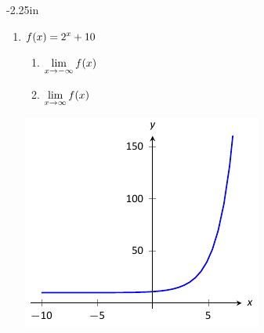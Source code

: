\begin{adjustwidth*}{}{-2.25in}
\begin{multicols*}{2}
\begin{enumerate}[1),resume]
\item
{$\displaystyle f(x) = 2^x+10$
\begin{enumerate}
\item		$\displaystyle \lim_{x\to -\infty} f(x)$
\item		$\displaystyle \lim_{x\to \infty} f(x)$
\end{enumerate}

\includegraphics[scale=.8]{figures/fig01_06_ex_40}
}

\end{enumerate}

\vspace{.5cm}

\end{multicols*}
\end{adjustwidth*}

\clearpage

